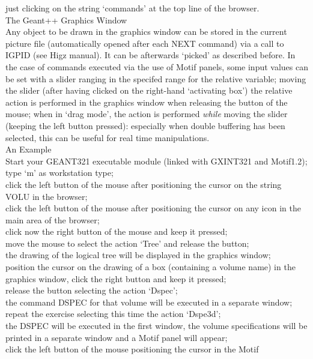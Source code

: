 just clicking on the string `commands' at the top line of the browser. \\[1em]
The Geant++ Graphics Window \\[1em]
Any object to be drawn in the graphics window can be stored in the current
picture file (automatically opened after each NEXT command) via a call to 
IGPID (see Higz manual). It can be afterwards `picked' as described before.
In the case of commands executed via the use of Motif panels, some input values
can be set with a slider ranging in the specifed range for the relative
variable; moving the slider (after having clicked on the right-hand `activating
box') the relative action is performed in the graphics
window when releasing the button of the mouse; when in `drag mode', the 
action is performed {\it while} moving the slider (keeping the left button
pressed): especially when double buffering has been selected, this can be
useful for real time manipulations.\\[1em]
An Example \\[1em]
Start your GEANT321 executable module (linked with GXINT321 and Motif1.2);
\\[.5em] type `m' as workstation type;
\\[.5em] click the left button of the mouse after positioning the cursor on the 
string VOLU in the browser;
\\[.5em] click the left button of the mouse after positioning the cursor on 
any icon in the main area of the browser;
\\[.5em] click now the right button of the mouse and keep it pressed;
\\[.5em] move the mouse to select the action `Tree' and release the button;
\\[.5em] the drawing of the logical tree will be displayed in the graphics
window;
\\[.5em] position the cursor on the drawing of a box (containing a volume name)
in the graphics window, click the right button and keep it pressed;
\\[.5em] release the button selecting the action `Dspec';
\\[.5em] the command DSPEC for that volume will be executed in a separate
window;
\\[.5em] repeat the exercise selecting this time the action `Dspe3d';
\\[.5em] the DSPEC will be executed in the first window, the volume 
specifications will be printed in a separate window and a Motif panel will
appear;
\\[.5em] click the left button of the mouse positioning the cursor in the Motif
